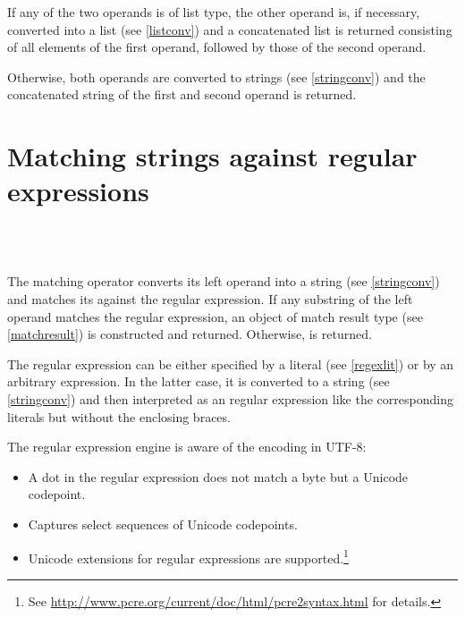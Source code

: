 \noindent
If any of the two operands is of list type, the other operand is, if
necessary, converted into a list (see \ref{listconv}) and a
concatenated list is returned consisting of all elements of the
first operand, followed by those of the second operand.

Otherwise, both operands are converted to strings (see \ref{stringconv})
and the concatenated string of the first and second operand is returned.

\section{Matching strings against regular expressions}

\begin{grammar}
      \produces {} \\
      \produces {}
         \lextoken{=\tildeSY}  \\
      \produces {}
         \lextoken{=\tildeSY} 
\end{grammar}

\noindent
The matching operator converts its left operand into a string
(see \ref{stringconv}) and matches its against the regular
expression. If any substring of the
left operand matches the regular expression, an object of match
result type (see \ref{matchresult})
is constructed and returned. Otherwise,  is returned.

The regular expression can be either specified by a literal
(see \ref{regexlit}) or by an arbitrary expression. In the latter
case, it is converted to a string (see \ref{stringconv}) and
then interpreted as an regular expression like the corresponding
literals but without the enclosing braces.

The regular expression engine is aware of the encoding
in UTF-8:
\begin{itemize}
   \item A dot in the regular expression does not match a byte
      but a Unicode codepoint.
   \item Captures select sequences of Unicode codepoints.
   \item Unicode extensions for regular expressions are
      supported.\footnote{See
      \url{http://www.pcre.org/current/doc/html/pcre2syntax.html}
      for details.}
\end{itemize}

